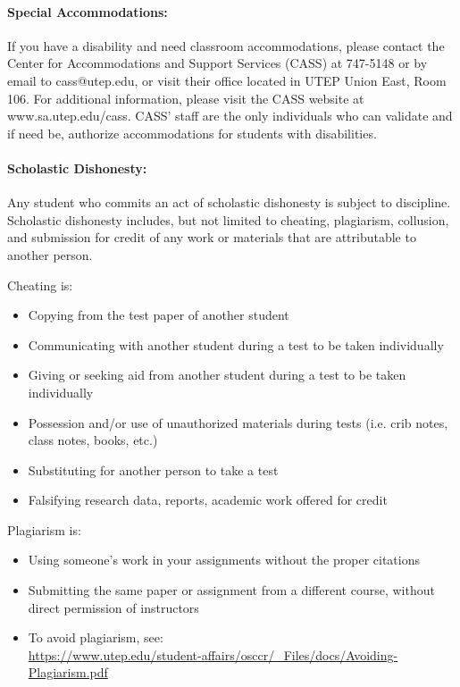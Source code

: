 \documentclass[12pt]{scrartcl}
\begin{document}
\paragraph{Special Accommodations: }
If you have a disability and need classroom accommodations, please contact the Center for Accommodations and Support Services (CASS) at 747-5148 or by email to cass@utep.edu, or visit their office located in UTEP Union East, Room 106. For additional information, please visit the CASS website at www.sa.utep.edu/cass. CASS’ staff are the only individuals who can validate and if need be, authorize accommodations for students with disabilities.


\paragraph{Scholastic Dishonesty: }
Any student who commits an act of scholastic dishonesty is subject to discipline. Scholastic dishonesty includes, but not limited to cheating, plagiarism, collusion, and submission for credit of any work or materials that are attributable to another person.

Cheating is:
\begin{itemize}
\item Copying from the test paper of another student
\item Communicating with another student during a test to be taken individually
\item Giving or seeking aid from another student during a test to be taken individually
\item Possession and/or use of unauthorized materials during tests (i.e. crib notes, class notes, books, etc.)
\item Substituting for another person to take a test
\item Falsifying research data, reports, academic work offered for credit
\end{itemize}

Plagiarism is:
\begin{itemize}
\item Using someone’s work in your assignments without the proper citations
\item Submitting the same paper or assignment from a different course, without direct permission of instructors
\item[]\vspace{1em} To avoid plagiarism, see: \\{\footnotesize\url{https://www.utep.edu/student-affairs/osccr/_Files/docs/Avoiding-Plagiarism.pdf}}
\end{itemize}
                               
\end{document}
